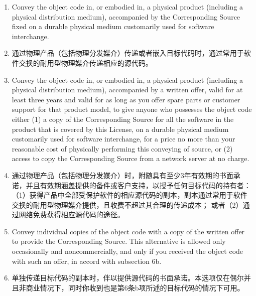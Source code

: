 \documentclass[11pt]{article}
\begin{document}
\begin{enumerate}
        \begin{enumerate}
          \item Convey the object code in, or embodied in, a physical product
                (including a physical distribution medium), accompanied by the
                Corresponding Source fixed on a durable physical medium
                customarily used for software interchange.

          \item 通过物理产品（包括物理分发媒介）传递或者嵌入目标代码时，通过常用于软件交换的耐用型物理媒介传递相应的源代码。

          \item Convey the object code in, or embodied in, a physical product
                (including a physical distribution medium), accompanied by a
                written offer, valid for at least three years and valid for as
                long as you offer spare parts or customer support for that product
                model, to give anyone who possesses the object code either (1) a
                copy of the Corresponding Source for all the software in the
                product that is covered by this License, on a durable physical
                medium customarily used for software interchange, for a price no
                more than your reasonable cost of physically performing this
                conveying of source, or (2) access to copy the
                Corresponding Source from a network server at no charge.

          \item 通过物理产品（包括物理分发媒介）时，附随具有至少3年有效期的书面承诺，并且有效期涵盖提供的备件或客户支持，以授予任何目标代码的持有者：
                （1）获得产品中全部受保护软件的相应源代码的副本，副本通过常用于软件交换的耐用型物理媒介提供，且收费不超过其合理的传递成本；
                或者（2）通过网络免费获得相应源代码的途径。

          \item Convey individual copies of the object code with a copy of the
                written offer to provide the Corresponding Source.  This
                alternative is allowed only occasionally and noncommercially, and
                only if you received the object code with such an offer, in accord
                with subsection 6b.

          \item 单独传递目标代码的副本时，伴以提供源代码的书面承诺。本选项仅在偶尔并且非商业情况下，同时你收到也是第6条b项所述的目标代码的情况下可用。


\end{enumerate}
\end{enumerate}
\end{document}
